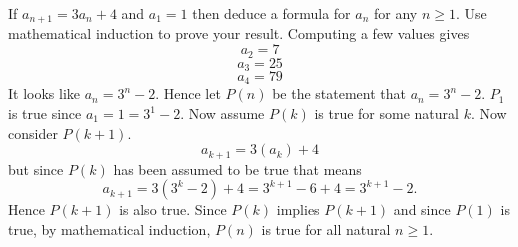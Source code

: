 If $a_{n+1} = 3a_n + 4$ and $a_1 = 1$ then deduce a formula for $a_n$ for any $n \geq 1$. Use mathematical induction to prove your result.
\newline
Computing a few values gives
\[
a_2 = 7
\]
\[
a_3 = 25
\]
\[
a_4 = 79
\]
It looks like $a_n = 3^n - 2$. Hence let $P(n)$ be the statement that $a_n = 3^n -2$. $P_1$ is true since $a_1 = 1 = 3^1 - 2.$ Now assume $P(k)$ is true for some natural $k$. Now consider $P(k+1)$. 
\[
a_{k+1} = 3(a_k) + 4
\]
but since $P(k)$ has been assumed to be true that means
\[
a_{k+1} = 3(3^k -2)+4 = 3^{k+1} - 6 + 4 = 3^{k+1} -2.
\]
Hence $P(k+1)$ is also true. Since $P(k)$ implies $P(k+1)$ and since $P(1)$ is true, by mathematical induction, $P(n)$ is true for all natural $n \geq 1$. 